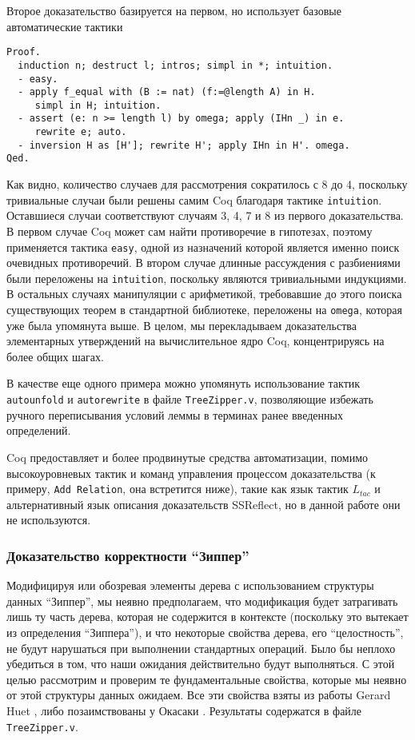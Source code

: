 Второе доказательство базируется на первом, но использует базовые автоматические тактики
\begin{lstlisting}
Proof.
  induction n; destruct l; intros; simpl in *; intuition.
  - easy.
  - apply f_equal with (B := nat) (f:=@length A) in H.
     simpl in H; intuition.
  - assert (e: n >= length l) by omega; apply (IHn _) in e.
     rewrite e; auto.
  - inversion H as [H']; rewrite H'; apply IHn in H'. omega.
Qed.
\end{lstlisting}

Как видно, количество случаев для рассмотрения сократилось с 8 до 4, поскольку тривиальные случаи были решены самим Coq благодаря тактике \texttt{intuition}.  Оставшиеся случаи соответствуют случаям 3, 4, 7 и 8 из первого доказательства. В первом случае Coq может сам найти противоречие в гипотезах, поэтому применяется тактика \texttt{easy}, одной из назначений которой является именно поиск очевидных противоречий. В втором случае длинные рассуждения с разбиениями были переложены на \texttt{intuition}, поскольку являются тривиальными индукциями. В остальных случаях манипуляции с арифметикой, требовавшие до этого поиска существующих теорем в стандартной библиотеке, переложены на \texttt{omega}, которая уже была упомянута выше. В целом, мы перекладываем доказательства элементарных утверждений на вычислительное ядро Coq, концентрируясь на более общих шагах.

В качестве еще одного примера можно упомянуть использование тактик \texttt{autounfold} и \texttt{autorewrite} в файле \texttt{TreeZipper.v}, позволяющие избежать ручного переписывания условий леммы в терминах ранее введенных определений.

Coq предоставляет и более продвинутые средства автоматизации, помимо высокоуровневых тактик и команд управления процессом доказательства (к примеру, \texttt{Add Relation}, она встретится ниже), такие как язык тактик $L_{tac}$ и альтернативный язык описания доказательств \textsf{SSReflect}, но в данной работе они не используются.

\subsubsection{Доказательство корректности ``Зиппер''}

Модифицируя или обозревая элементы дерева с использованием структуры данных ``Зиппер'', мы неявно предполагаем, что модификация будет затрагивать лишь ту часть дерева, которая не содержится в контексте (поскольку это вытекает из определения ``Зиппера''), и что некоторые свойства дерева, его ``целостность'', не будут нарушаться при выполнении стандартных операций. Было бы неплохо убедиться в том, что наши ожидания действительно будут выполняться. С этой целью рассмотрим и проверим те фундаментальные свойства, которые мы неявно от этой структуры данных ожидаем. Все эти свойства взяты из работы Gerard Huet \autocite{Huet1997}, либо позаимствованы у Окасаки \autocite{Okasaki1996}. Результаты содержатся в файле \texttt{TreeZipper.v}.

